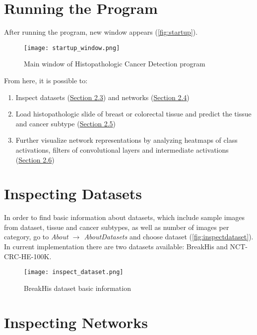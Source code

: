 \section{Running the Program}

After running the program, new window appears (\textcolor{red}{\autoref{fig:startup}}).

\begin{figure}[h]
	\centering
	\texttt{[image: startup\_window.png]}
	\caption{Main window of Histopathologic Cancer Detection program}
	\label{fig:startup}
\end{figure}

From here, it is possible to:
\begin{enumerate}
	\itemsep 0em
	\item Inspect datasets (\textcolor{red}{\hyperref[inspdata]{Section 2.3}}) and networks (\textcolor{red}{\hyperref[inspnets]{Section 2.4}})
	\item Load histopathologic slide of breast or colorectal tissue and predict the tissue and cancer subtype (\textcolor{red}{\hyperref[basicuse]{Section 2.5}})
	\item Further visualize network representations by analyzing heatmaps of class activations, filters of convolutional layers and intermediate activations\\ (\textcolor{red}{\hyperref[advuse]{Section 2.6}})
\end{enumerate}
\clearpage

\section{Inspecting Datasets}
\label{inspdata}

In order to find basic information about datasets, which include sample images from dataset, tissue and cancer subtypes, as well as number of images per category, go to \emph{About $\rightarrow$ About\;Datasets} and choose dataset (\textcolor{red}{\autoref{fig:inspectdataset}}). In current implementation there are two datasets available: BreakHis and NCT-CRC-HE-100K.

\begin{figure}[h]
	\centering
	\texttt{[image: inspect\_dataset.png]}
	\caption{BreakHis dataset basic information}
	\label{fig:inspectdataset}
\end{figure}

\section{Inspecting Networks}
\label{inspnets}

